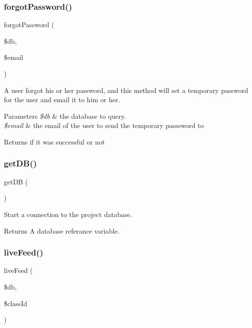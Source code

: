 \subsubsection{\texorpdfstring{forgot\+Password()}{forgotPassword()}}
{\footnotesize\ttfamily forgot\+Password (\begin{DoxyParamCaption}\item[{}]{\$db,  }\item[{}]{\$email }\end{DoxyParamCaption})}



A user forgot his or her password, and this method will set a temporary password for the user and email it to him or her. 


\begin{DoxyParams}{Parameters}
{\em \$db} & the database to query. \\
\hline
{\em \$email} & the email of the user to send the temporary passsword to \\
\hline
\end{DoxyParams}
\begin{DoxyReturn}{Returns}
if it was successful or not 
\end{DoxyReturn}
\mbox{\label{androidApi_8php_a4162847310de81b83504109485866a7c}} 
\subsubsection{\texorpdfstring{get\+D\+B()}{getDB()}}
{\footnotesize\ttfamily get\+DB (\begin{DoxyParamCaption}{ }\end{DoxyParamCaption})}



Start a connection to the project database. 

\begin{DoxyReturn}{Returns}
A database referance variable. 
\end{DoxyReturn}
\mbox{\label{androidApi_8php_a62900745b211b6c128ff5d2019613cbf}} 
\subsubsection{\texorpdfstring{live\+Feed()}{liveFeed()}}
{\footnotesize\ttfamily live\+Feed (\begin{DoxyParamCaption}\item[{}]{\$db,  }\item[{}]{\$class\+Id }\end{DoxyParamCaption})}



